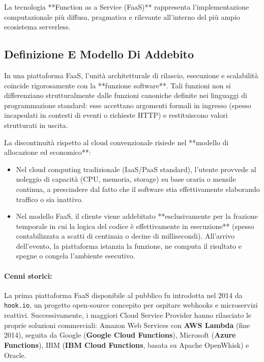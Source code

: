 \documentclass[11pt, a4paper]{article}
\begin{document}
La tecnologia **Function as a Service (FaaS)** rappresenta l'implementazione computazionale più diffusa, pragmatica e rilevante all'interno del più ampio ecosistema serverless.

\subsection{Definizione E Modello Di Addebito}

In una piattaforma FaaS, l'unità architetturale di rilascio, esecuzione e scalabilità coincide rigorosamente con la **funzione software**. Tali funzioni non si differenziano strutturalmente dalle funzioni canoniche definite nei linguaggi di programmazione standard: esse accettano argomenti formali in ingresso (spesso incapsulati in contesti di eventi o richieste HTTP) e restituiscono valori strutturati in uscita.

La discontinuità rispetto al cloud convenzionale risiede nel **modello di allocazione ed economico**:
\begin{itemize}[noitemsep]
    \item Nel cloud computing tradizionale (IaaS/PaaS standard), l'utente provvede al noleggio di capacità (CPU, memoria, storage) su base oraria o mensile continua, a prescindere dal fatto che il software stia effettivamente elaborando traffico o sia inattivo.
    \item Nel modello FaaS, il cliente viene addebitato **esclusivamente per la frazione temporale in cui la logica del codice è effettivamente in esecuzione** (spesso contabilizzata a scatti di centinaia o decine di millisecondi). All'arrivo dell'evento, la piattaforma istanzia la funzione, ne computa il risultato e spegne o congela l'ambiente esecutivo.
\end{itemize}

\paragraph{Cenni storici:} La prima piattaforma FaaS disponibile al pubblico fu introdotta nel 2014 da \texttt{hook.io}, un progetto open-source concepito per ospitare webhooks e microservizi reattivi. Successivamente, i maggiori Cloud Service Provider hanno rilasciato le proprie soluzioni commerciali: Amazon Web Services con \textbf{AWS Lambda} (fine 2014), seguita da Google (\textbf{Google Cloud Functions}), Microsoft (\textbf{Azure Functions}), IBM (\textbf{IBM Cloud Functions}, basata su Apache OpenWhisk) e Oracle.
\end{document}
